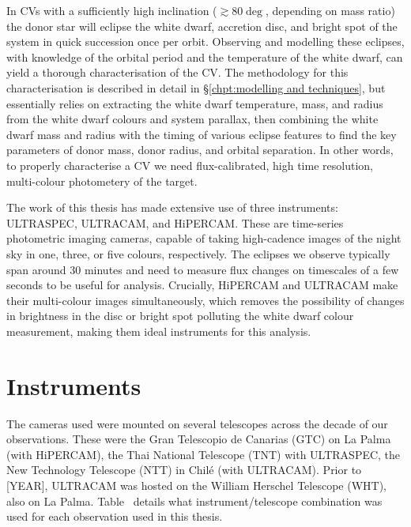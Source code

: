 
\label{chpt:observations and observational techniques} %

In CVs with a sufficiently high inclination ($\gtrsim 80 \deg$, depending on mass ratio) the donor star will eclipse the white dwarf, accretion disc, and bright spot of the system in quick succession once per orbit. Observing and modelling these eclipses, with knowledge of the orbital period and the temperature of the white dwarf, can yield a thorough characterisation of the CV. The methodology for this characterisation is described in detail in \S\ref{chpt:modelling and techniques}, but essentially relies on extracting the white dwarf temperature, mass, and radius from the white dwarf colours and system parallax, then combining the white dwarf mass and radius with the timing of various eclipse features to find the key parameters of donor mass, donor radius, and orbital separation. In other words, to properly characterise a CV we need flux-calibrated, high time resolution, multi-colour photometery of the target. 

The work of this thesis has made extensive use of three instruments: ULTRASPEC, ULTRACAM, and HiPERCAM.
These are time-series photometric imaging cameras, capable of taking high-cadence images of the night sky in one, three, or five colours, respectively. 
The eclipses we observe typically span around 30 minutes and need to measure flux changes on timescales of a few seconds to be useful for analysis.
Crucially, HiPERCAM and ULTRACAM make their multi-colour images simultaneously, which removes the possibility of changes in brightness in the disc or bright spot polluting the white dwarf colour measurement, making them ideal instruments for this analysis. 


\section{Instruments}
\label{sect:observations:cameras}

The cameras used were mounted on several telescopes across the decade of our observations. These were the Gran Telescopio de Canarias (GTC) on La Palma (with HiPERCAM), the Thai National Telescope (TNT) with ULTRASPEC, the New Technology Telescope (NTT) in Chil\'e (with ULTRACAM). Prior to [YEAR], ULTRACAM was hosted on the William Herschel Telescope (WHT), also on La Palma. Table~ details what instrument/telescope combination was used for each observation used in this thesis.


